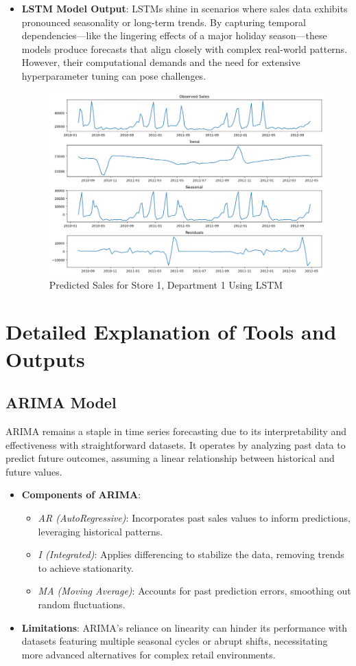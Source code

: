 \begin{itemize}
    \item \textbf{LSTM Model Output}: LSTMs shine in scenarios where sales data exhibits pronounced seasonality or long-term trends. By capturing temporal dependencies—like the lingering effects of a major holiday season—these models produce forecasts that align closely with complex real-world patterns. However, their computational demands and the need for extensive hyperparameter tuning can pose challenges.
    \begin{figure}[h]
        \centering
        \includegraphics[width=0.8\linewidth]{latex/figures_adarsh/LSTM.png}
        \caption{Predicted Sales for Store 1, Department 1 Using LSTM}
        \label{fig:sales_forecast}
    \end{figure}
\end{itemize}

\section{Detailed Explanation of Tools and Outputs}
\subsection{ARIMA Model}
ARIMA remains a staple in time series forecasting due to its interpretability and effectiveness with straightforward datasets. It operates by analyzing past data to predict future outcomes, assuming a linear relationship between historical and future values.
\begin{itemize}
    \item \textbf{Components of ARIMA}:
    \begin{itemize}
        \item \textit{AR (AutoRegressive)}: Incorporates past sales values to inform predictions, leveraging historical patterns.
        \item \textit{I (Integrated)}: Applies differencing to stabilize the data, removing trends to achieve stationarity.
        \item \textit{MA (Moving Average)}: Accounts for past prediction errors, smoothing out random fluctuations.
    \end{itemize}
    \item \textbf{Limitations}: ARIMA’s reliance on linearity can hinder its performance with datasets featuring multiple seasonal cycles or abrupt shifts, necessitating more advanced alternatives for complex retail environments.
\end{itemize}

